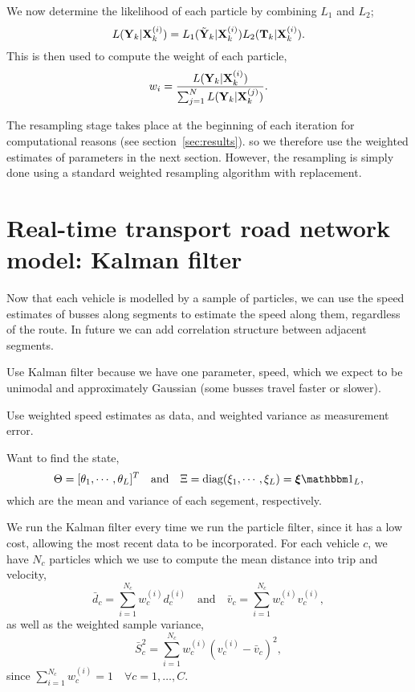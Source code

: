 \documentclass[draftcls,a4paper,onecolumn]{IEEEtran}\usepackage[]{graphicx}\usepackage[]{color}
\begin{document}
We now determine the likelihood of each particle by combining $L_1$ and $L_2$;
\begin{equation}
  \label{eq:particle_likelihood}
  L (\mathbf{Y}_k | \mathbf{X}_k^{(i)}) = L_1(\tilde{\mathbf{Y}}_k|\mathbf{X}_k^{(i)}) L_2(\mathbf{T}_k | \mathbf{X}_k^{(i)}).
\end{equation}
This is then used to compute the weight of each particle,
\begin{equation}
  \label{eq:particle_weights}
  w_i = \frac{L (\mathbf{Y}_k | \mathbf{X}_k^{(i)})}{\sum_{j=1}^N   L (\mathbf{Y}_k | \mathbf{X}_k^{(j)})}.
\end{equation}

The resampling stage takes place at the beginning of each iteration for computational 
reasons (see section~\ref{sec:results}).
so we therefore use the weighted estimates of parameters in the next section.
However, the resampling is simply done using a standard weighted resampling 
algorithm with replacement.


\section{Real-time transport road network model: Kalman filter}
\label{sec:kf}

Now that each vehicle is modelled by a sample of particles,
we can use the speed estimates of busses along segments to estimate
the speed along them, regardless of the route.
In future we can add correlation structure between adjacent segments.

Use Kalman filter because we have one parameter, speed, 
which we expect to be unimodal and approximately Gaussian
(some busses travel faster or slower).

Use weighted speed estimates as data,
and weighted variance as measurement error.

Want to find the state,
\begin{equation}
  \label{eq:kf_state}
  \Theta = [\theta_1, \cdots, \theta_L]^T\quad\text{and}\quad
  \Xi = \diag(\xi_1, \cdots, \xi_L) = \bxi\eye_L,
\end{equation}
which are the mean and variance of each segement, respectively.


We run the Kalman filter every time we run the particle filter,
since it has a low cost, allowing the most recent data to be incorporated.
For each vehicle $c$, we have $N_c$ particles which we use to
compute the mean distance into trip and velocity,
\begin{equation}
  \label{eq:weighted_mean}
  \bar d_c = \sum_{i=1}^{N_c} w_c^{(i)} d_c^{(i)} \quad\text{and}\quad
  \bar v_c = \sum_{i=1}^{N_c} w_c^{(i)} v_c^{(i)},
\end{equation}
as well as the weighted sample variance,
\begin{equation}
  \label{eq:weighted_variance}
  \bar S_c^2 = \sum_{i=1}^{N_c} w_c^{(i)} (v_c^{(i)} - \bar v_c)^2,
\end{equation}
since $\sum_{i=1}^{N_c} w_c^{(i)} = 1\quad \forall c = 1,\ldots,C$.
\end{document}
